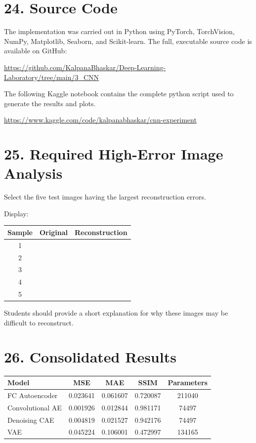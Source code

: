 \documentclass[10pt]{article}
\begin{document}
\section*{24. Source Code}
The implementation was carried out in Python using PyTorch, TorchVision, NumPy, Matplotlib, Seaborn, and Scikit-learn. The full, executable source code is available on GitHub:
\begin{center}
\url{https://github.com/KalpanaBhaskar/Deep-Learning-Laboratory/tree/main/3_CNN}
\end{center}
The following Kaggle notebook contains the complete python script used to generate the results and plots.
\begin{center}
\url{https://www.kaggle.com/code/kalpanabhaskar/cnn-experiment}
\end{center}
\section*{25. Required High-Error Image Analysis}

Select the five test images having the largest reconstruction errors.

Display:

\begin{center}
\begin{tabular}{|c|c|c|}
\hline
Sample & Original & Reconstruction\\
\hline
1 & &\\
2 & &\\
3 & &\\
4 & &\\
5 & &\\
\hline
\end{tabular}
\end{center}

Students should provide a short explanation for why these images may be
difficult to reconstruct.

\section*{26. Consolidated Results}

\begin{center}
\begin{tabular}{|l|c|c|c|c|}
\hline
Model & MSE & MAE & SSIM & Parameters \\
\hline
FC Autoencoder   & 0.023641 & 0.061607 & 0.720087 & 211040  \\
Convolutional AE & 0.001926 & 0.012844 & 0.981171 & 74497  \\
Denoising CAE    & 0.004819 & 0.021527 & 0.942176 & 74497  \\
VAE              & 0.045224 & 0.106001 & 0.472997 & 134165 \\
\hline
\end{tabular}
\end{center}
\end{document}
